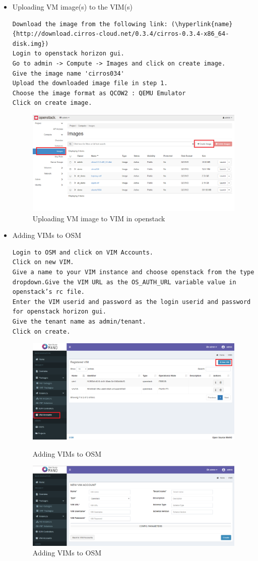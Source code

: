 \begin{itemize}
\item Uploading VM image(s) to the VIM(s)
\begin{lstlisting}
Download the image from the following link: (\hyperlink{name}{http://download.cirros-cloud.net/0.3.4/cirros-0.3.4-x86_64-disk.img})
Login to openstack horizon gui.
Go to admin -> Compute -> Images and click on create image.
Give the image name 'cirros034'
Upload the downloaded image file in step 1.
Choose the image format as QCOW2 : QEMU Emulator
Click on create image.
\end{lstlisting}
\begin{figure} [H]
	\centering
	\includegraphics[width=0.5\linewidth]{figures/sh8}
	\caption{Uploading VM image to VIM in openstack}
\end{figure}
\item Adding VIMs to OSM
\begin{lstlisting}
Login to OSM and click on VIM Accounts.
Click on new VIM.
Give a name to your VIM instance and choose openstack from the type dropdown.Give the VIM URL as the OS_AUTH_URL variable value in openstack’s rc file.
Enter the VIM userid and password as the login userid and password for openstack horizon gui.
Give the tenant name as admin/tenant.
Click on create.
\end{lstlisting}
\begin{figure} [H]
	\centering
	\includegraphics[width=0.5\linewidth]{figures/sh6}
	\caption{Adding VIMs to OSM}
	\includegraphics[width=0.5\linewidth]{figures/sh7}
	\caption{Adding VIMs to OSM}
\end{figure}
\end{itemize}
\newpage
